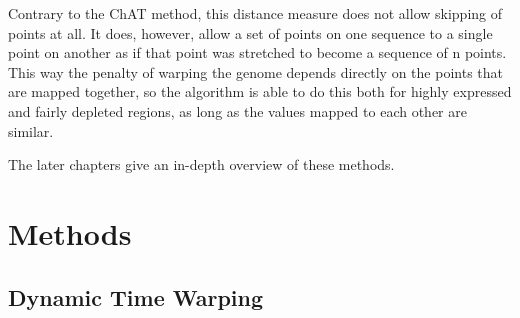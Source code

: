 \documentclass[parskip]{cs4rep}
\begin{document}
Contrary to the ChAT method, this distance measure does not allow skipping of points at all. It does, however, allow a set of points on one sequence to a single point on another as if that point was stretched to become a sequence of n points. This way the penalty of warping the genome depends directly on the points that are mapped together, so the algorithm is able to do this both for highly expressed and fairly depleted regions, as long as the values mapped to each other are similar.

The later chapters give an in-depth overview of these methods.

\chapter{Methods}
\section{Dynamic Time Warping}
\label{sec:DTW}
\end{document}
